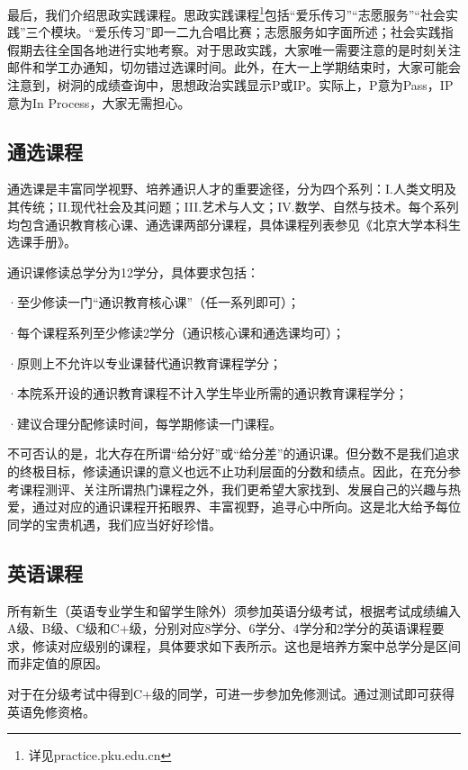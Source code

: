 \documentclass[11pt,oneside]{book}
\begin{document}
\vspace{10pt}

最后，我们介绍思政实践课程。思政实践课程\footnote{详见practice.pku.edu.cn}包括“爱乐传习”“志愿服务”“社会实践”三个模块。“爱乐传习”即一二九合唱比赛；志愿服务如字面所述；社会实践指假期去往全国各地进行实地考察。对于思政实践，大家唯一需要注意的是时刻关注邮件和学工办通知，切勿错过选课时间。此外，在大一上学期结束时，大家可能会注意到，树洞的成绩查询中，思想政治实践显示P或IP。实际上，P意为Pass，IP意为In Process，大家无需担心。

\subsection{通选课程}
通选课是丰富同学视野、培养通识人才的重要途径，分为四个系列：I.人类文明及其传统；II.现代社会及其问题；III.艺术与人文；IV.数学、自然与技术。每个系列均包含通识教育核心课、通选课两部分课程，具体课程列表参见《北京大学本科生选课手册》。

\vspace{10pt}

通识课修读总学分为12学分，具体要求包括：

·至少修读一门“通识教育核心课”（任一系列即可）；

·每个课程系列至少修读2学分（通识核心课和通选课均可）；

·原则上不允许以专业课替代通识教育课程学分；

·本院系开设的通识教育课程不计入学生毕业所需的通识教育课程学分；

·建议合理分配修读时间，每学期修读一门课程。

\vspace{10pt}

不可否认的是，北大存在所谓“给分好”或“给分差”的通识课。但分数不是我们追求的终极目标，修读通识课的意义也远不止功利层面的分数和绩点。因此，在充分参考课程测评、关注所谓热门课程之外，我们更希望大家找到、发展自己的兴趣与热爱，通过对应的通识课程开拓眼界、丰富视野，追寻心中所向。这是北大给予每位同学的宝贵机遇，我们应当好好珍惜。

\subsection{英语课程}
所有新生（英语专业学生和留学生除外）须参加英语分级考试，根据考试成绩编入A级、B级、C级和C+级，分别对应8学分、6学分、4学分和2学分的英语课程要求，修读对应级别的课程，具体要求如下表所示。这也是培养方案中总学分是区间而非定值的原因。

对于在分级考试中得到C+级的同学，可进一步参加免修测试。通过测试即可获得英语免修资格。
\end{document}
